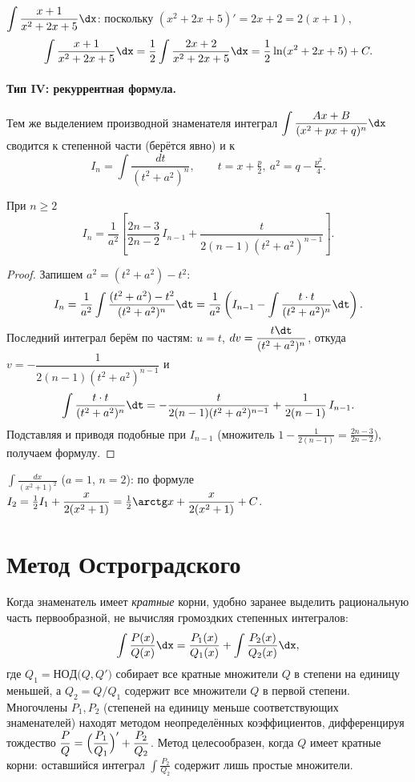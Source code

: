 \begin{example}
$\displaystyle\int\frac{x+1}{x^2+2x+5}\dx$: поскольку $(x^2+2x+5)'=2x+2=2(x+1)$,
\[
  \int\frac{x+1}{x^2+2x+5}\dx=\frac12\int\frac{2x+2}{x^2+2x+5}\dx=\frac12\ln(x^2+2x+5)+C.
\]
\end{example}

\paragraph{Тип IV: рекуррентная формула.} Тем же выделением производной знаменателя интеграл
$\displaystyle\int\frac{Ax+B}{(x^2+px+q)^n}\dx$ сводится к степенной части (берётся явно) и к
\[
  I_n=\int\frac{dt}{(t^2+a^2)^n},\qquad t=x+\tfrac p2,\ a^2=q-\tfrac{p^2}4 .
\]

\begin{theorem}
При $n\ge2$
\[
  I_n=\frac{1}{a^2}\left[\frac{2n-3}{2n-2}\,I_{n-1}+\frac{t}{2(n-1)(t^2+a^2)^{n-1}}\right].
\]
\end{theorem}

\begin{proof}
Запишем $a^2=(t^2+a^2)-t^2$:
\[
  I_n=\frac1{a^2}\int\frac{(t^2+a^2)-t^2}{(t^2+a^2)^n}\dt
     =\frac1{a^2}\left(I_{n-1}-\int\frac{t\cdot t}{(t^2+a^2)^n}\dt\right).
\]
Последний интеграл берём по частям: $u=t$, $dv=\dfrac{t\dt}{(t^2+a^2)^n}$, откуда
$v=-\dfrac{1}{2(n-1)(t^2+a^2)^{n-1}}$ и
\[
  \int\frac{t\cdot t}{(t^2+a^2)^n}\dt
   =-\frac{t}{2(n-1)(t^2+a^2)^{n-1}}+\frac{1}{2(n-1)}\,I_{n-1}.
\]
Подставляя и приводя подобные при $I_{n-1}$ (множитель $1-\tfrac1{2(n-1)}=\tfrac{2n-3}{2n-2}$),
получаем формулу.
\end{proof}

\begin{example}
$\displaystyle\int\frac{dx}{(x^2+1)^2}$ ($a=1$, $n=2$): по формуле
$I_2=\tfrac12 I_1+\dfrac{x}{2(x^2+1)}=\tfrac12\arctg x+\dfrac{x}{2(x^2+1)}+C$.
\end{example}

\section{Метод Остроградского}

Когда знаменатель имеет \emph{кратные} корни, удобно заранее выделить рациональную часть
первообразной, не вычисляя громоздких степенных интегралов:
\[
  \int\frac{P(x)}{Q(x)}\dx=\frac{P_1(x)}{Q_1(x)}+\int\frac{P_2(x)}{Q_2(x)}\dx,
\]
где $Q_1=\mathrm{НОД}\bigl(Q,Q'\bigr)$ собирает все кратные множители $Q$ в степени на единицу
меньшей, а $Q_2=Q/Q_1$ содержит все множители $Q$ в первой степени. Многочлены $P_1,P_2$ (степеней
на единицу меньше соответствующих знаменателей) находят методом неопределённых коэффициентов,
дифференцируя тождество
$\dfrac{P}{Q}=\Bigl(\dfrac{P_1}{Q_1}\Bigr)'+\dfrac{P_2}{Q_2}$. Метод целесообразен, когда $Q$
имеет кратные корни: оставшийся интеграл $\int\frac{P_2}{Q_2}$ содержит лишь простые множители.

